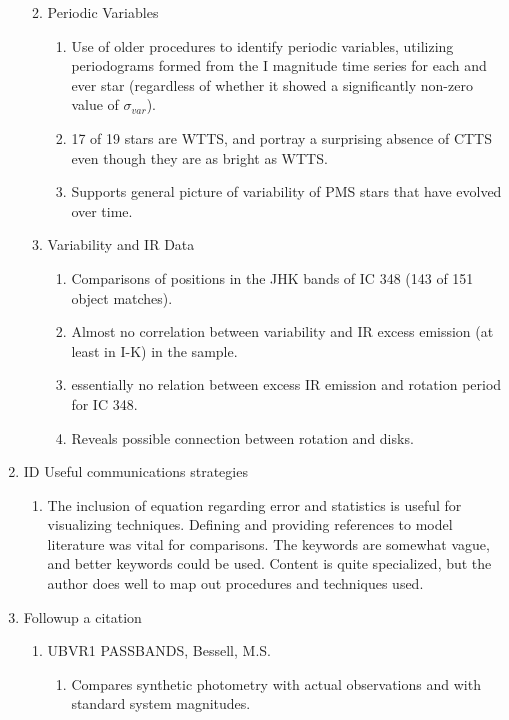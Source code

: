 \documentclass[twocolumn]{aastex6}
\begin{document}
\begin{enumerate}
\begin{enumerate}
\begin{enumerate}
				\end{enumerate}
			\item Periodic Variables
				\begin{enumerate}
					\item Use of older procedures to identify periodic variables, utilizing periodograms formed from the I magnitude time series for each and ever star (regardless of whether it showed a significantly non-zero value of $\sigma$$_{var}$).
					\item 17 of 19 stars are WTTS, and portray a surprising absence of CTTS even though they are as bright as WTTS.
					\item Supports general picture of variability of PMS stars that have evolved over time.
				\end{enumerate}
			\item Variability and IR Data
				\begin{enumerate}
					\item Comparisons of positions in the JHK bands of IC 348 (143 of 151 object matches).
					\item Almost no correlation between variability and IR excess emission (at least in I-K) in the sample.
					\item essentially no relation between excess IR emission and rotation period for IC 348.
					\item Reveals possible connection between rotation and disks.
				\end{enumerate}
		\end{enumerate}
	\item ID Useful communications strategies
		\begin{enumerate}
			\item The inclusion of equation regarding error and statistics is useful for visualizing techniques. Defining and providing references to model literature was vital for comparisons. The keywords are somewhat vague, and better keywords could be used. Content is quite specialized, but the author does well to map out procedures and techniques used.
		\end{enumerate}
	\item Followup a citation
		\begin{enumerate}
			\item UBVR1 PASSBANDS, Bessell, M.S.\,\cite{3}
				\begin{enumerate}
					\item Compares synthetic photometry with actual observations and with standard system magnitudes.

\end{enumerate}
\end{enumerate}
\end{enumerate}
\end{document}
